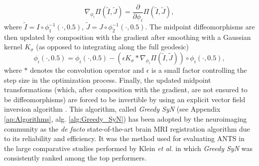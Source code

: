 \begin{equation}\label{eq:grad_metric}
    \nabla_{\phi_{i}} \Pi(\tilde{I}, \tilde{J}) = \frac{\partial}{\partial \phi_{i}} \Pi \left( \tilde{I}, \tilde{J}\right),
\end{equation}
where $\tilde{I} = I \circ \phi_{1}^{-1}(\cdot, 0.5)$, $\tilde{J} = J \circ \phi_{2}^{-1}(\cdot, 0.5)$. The midpoint diffeomorphisms are then updated by composition with the gradient after smoothing with a Gaussian kernel $K_{\sigma}$ (as opposed to integrating along the full geodesic)
\begin{equation}\label{eq:gsyn_update}
    \phi_{i}(\cdot, 0.5) = \phi_{i}(\cdot, 0.5) - \left( \epsilon K_{\sigma} \ast \nabla_{\phi_{i}} \Pi(\tilde{I}, \tilde{J}) \right) \circ \phi_{i}(\cdot, 0.5),
\end{equation}
where $\ast$ denotes the convolution operator and $\epsilon$ is a small factor controlling the step size in the optimization process. Finally, the updated midpoint transformations (which, after composition with the gradient, are not ensured to be diffeomorphisms) are forced to be invertible by using an explicit vector field inversion algorithm \citep{Chen2008}. This algorithm, called \textit{Greedy SyN} (see Appendix \ref{ap:Algorithms}, alg. \ref{alg:Greedy_SyN}) has been adopted by the neuroimaging community as the \textit{de facto} state-of-the-art brain MRI registration algorithm due to its reliability and efficiency. It was the method used for evaluating ANTS \citep{Avants2011} in the large comparative studies performed by Klein {\it et al.} \cite{Klein2009, Klein2010} in which \textit{Greedy SyN} was consistently ranked among the top performers.

